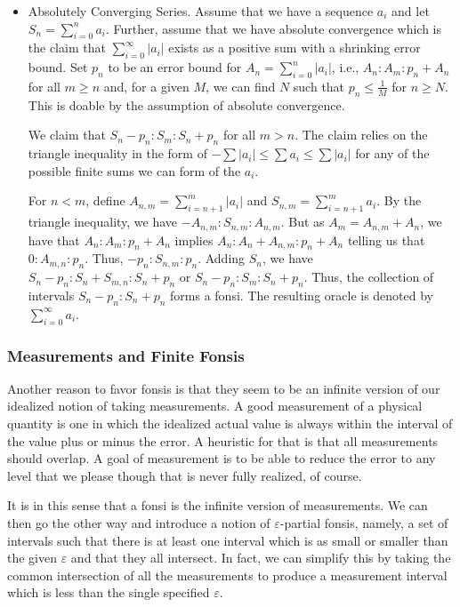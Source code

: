\documentclass[12pt]{article}
\begin{document}
\begin{itemize}
    \item Absolutely Converging Series. Assume that we have a sequence $a_i$ and let $S_n = \sum_{i=0}^n a_i$. Further, assume that we have absolute convergence which is the claim that $\sum_{i=0}^\infty |a_i|$ exists as a positive sum  with a shrinking error bound. Set $p_n$ to be an error bound for $A_n = \sum_{i=0}^n |a_i|$, i.e., $A_n : A_m : p_n + A_n$ for all $m \geq n$ and, for a given $M$, we can find $N$ such that $p_n \leq \frac{1}{M}$ for $n \geq N$.  This is doable by the assumption of absolute convergence.
    
    We claim that $S_n-p_n: S_m : S_n + p_n$ for all $m > n$.  The claim relies on the triangle inequality in the form of $- \sum |a_i| \leq \sum a_i \leq \sum |a_i| $ for any of the possible finite sums we can form of the $a_i$.

    For $n < m$, define $A_{n,m} = \sum_{i=n+1}^m |a_i|$ and $S_{n,m} = \sum_{i=n+1}^m a_i$. By the triangle inequality, we have $-A_{n,m} : S_{n,m} : A_{n,m}$. But as $A_m = A_{n,m} + A_n $, we have that $A_n:A_m:p_n + A_n$ implies $A_n : A_n+ A_{n,m} : p_n + A_n$ telling us that $0: A_{m,n} : p_n$. Thus, $-p_n : S_{n,m} : p_n$. Adding $S_n$, we have $S_n - p_n : S_n + S_{m,n} : S_n + p_n$  or $S_n - p_n : S_m : S_n + p_n$. Thus, the collection of intervals $S_n-p_n:S_n+p_n$ forms a fonsi. The resulting oracle is denoted by $\sum_{i=0}^\infty a_i$.
\end{itemize}

\subsubsection{Measurements and Finite Fonsis}

Another reason to favor fonsis is that they seem to be an infinite version of our idealized notion of taking measurements. A good measurement of a physical quantity is one in which the idealized actual value is always within the interval of the value plus or minus the error. A heuristic for that is that all measurements should overlap. A goal of measurement is to be able to reduce the error to any level that we please though that is never fully realized, of course. 

It is in this sense that a fonsi is the infinite version of measurements. We can then go the other way and introduce a notion of $\varepsilon$-partial fonsis, namely, a set of intervals such that there is at least one interval which is as small or smaller than the given $\varepsilon$ and that they all intersect. In fact, we can simplify this by taking the common intersection of all the measurements to produce a measurement interval which is less than the single specified $\varepsilon$. 
\end{document}
